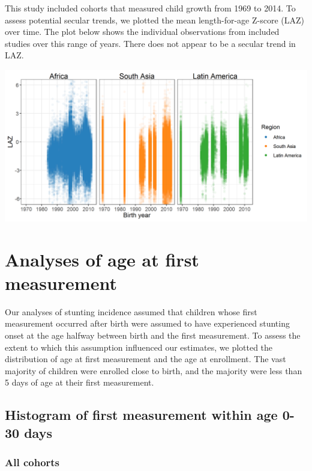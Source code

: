 \documentclass[9pt,]{book}
\begin{document}
\raggedright

This study included cohorts that measured child growth from 1969 to 2014. To assess potential secular trends, we plotted the mean length-for-age Z-score (LAZ) over time. The plot below shows the individual observations from included studies over this range of years. There does not appear to be a secular trend in LAZ.

\includegraphics[width=33.33in]{figure-copies/laz_secular_trend}

\hypertarget{age-meas}{%
\chapter{Analyses of age at first measurement}\label{age-meas}}

\raggedright

Our analyses of stunting incidence assumed that children whose first measurement occurred after birth were assumed to have experienced stunting onset at the age halfway between birth and the first measurement. To assess the extent to which this assumption influenced our estimates, we plotted the distribution of age at first measurement and the age at enrollment. The vast majority of children were enrolled close to birth, and the majority were less than 5 days of age at their first measurement.

\hypertarget{histogram-of-first-measurement-within-age-0-30-days}{%
\section{Histogram of first measurement within age 0-30 days}\label{histogram-of-first-measurement-within-age-0-30-days}}

\hypertarget{all-cohorts}{%
\subsection{All cohorts}\label{all-cohorts}}
\end{document}
